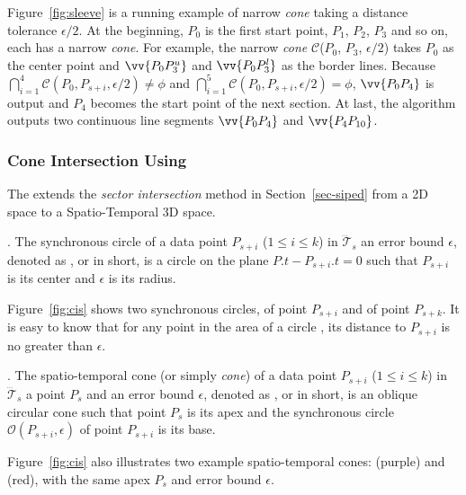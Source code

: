 \begin{example}
	\label{exm-alg-sleeve}
	Figure~\ref{fig:sleeve} is a running example of narrow \emph{cone} taking a distance tolerance $\epsilon/2$. At the beginning, $P_0$ is the first start point, $P_1$, $P_2$, $P_3$ and so on, each has a narrow \emph{cone}.
	For example, the narrow \emph{cone} $\mathcal{C}$($P_0$, $P_{3}$, $\epsilon/2$) takes $P_0$ as the center point and $\vv{P_0P^u_{3}}$ and $\vv{P_0P^l_{3}}$ as the border lines.
	Because $\bigcap_{i=1}^{4}\mathcal{C}(P_0, P_{s+i}, \epsilon/2) \ne \phi$ and $\bigcap_{i=1}^{5}\mathcal{C}(P_0, P_{s+i}, \epsilon/2) = \phi$, $\vv{P_0P_4}$ is output and $P_4$ becomes the start point of the next section.
	At last, the algorithm outputs two continuous line segments $\vv{P_0P_4}$ and $\vv{P_4P_{10}}$.
\end{example}




\subsubsection {Cone Intersection Using \sed}
\label{sec-cised}

The \cised extends the \textit{sector intersection} method in Section~\ref{sec-siped} from a 2D space to a Spatio-Temporal 3D space.

. The synchronous circle of a data point $P_{s+i}$ ($1\le i\le k$) in $\dddot{\mathcal{T}}_s$ \wrt an error bound $\epsilon$, denoted as , or  in short, is a circle on the plane $P.t-P_{s+i}.t = 0$ such that $P_{s+i}$ is its center and $\epsilon$ is its radius.

Figure~\ref{fig:cis} shows two synchronous circles,  of point $P_{s+i}$ and  of point $P_{s+k}$.
It is easy to know that for any point in the area of a circle , its distance to $P_{s+i}$ is no greater than $\epsilon$.


. The spatio-temporal cone (or simply \textit{cone}) of a data point $P_{s+i}$ ($1\le i\le k$) in $\dddot{\mathcal{T}}_s$ \wrt a point $P_s$ and an error bound $\epsilon$, denoted as , or  in short, is an oblique circular cone such that point $P_s$ is its apex and the synchronous circle $\mathcal{O}(P_{s+i}, \epsilon)$ of point $P_{s+i}$ is its base.

Figure~\ref{fig:cis} also illustrates two example spatio-temporal cones:  {(purple)} and  (red), with the same apex $P_s$ and error bound $\epsilon$.


